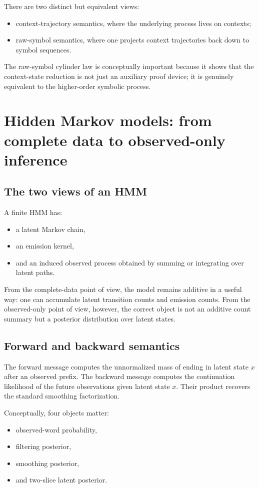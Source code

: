 \documentclass[11pt]{article}
\begin{document}
There are two distinct but equivalent views:
\begin{itemize}
  \item context-trajectory semantics, where the underlying process lives on
        contexts;
  \item raw-symbol semantics, where one projects context trajectories back down
        to symbol sequences.
\end{itemize}

The raw-symbol cylinder law is conceptually important because it shows that the
context-state reduction is not just an auxiliary proof device; it is genuinely
equivalent to the higher-order symbolic process.

\section{Hidden Markov models: from complete data to observed-only inference}

\subsection{The two views of an HMM}

A finite HMM has:
\begin{itemize}
  \item a latent Markov chain,
  \item an emission kernel,
  \item and an induced observed process obtained by summing or integrating over
        latent paths.
\end{itemize}

From the complete-data point of view, the model remains additive in a useful
way: one can accumulate latent transition counts and emission counts.  From the
observed-only point of view, however, the correct object is not an additive
count summary but a posterior distribution over latent states.

\subsection{Forward and backward semantics}

The forward message computes the unnormalized mass of ending in latent state
$x$ after an observed prefix.  The backward message computes the continuation
likelihood of the future observations given latent state $x$.  Their product
recovers the standard smoothing factorization.

Conceptually, four objects matter:
\begin{itemize}
  \item observed-word probability,
  \item filtering posterior,
  \item smoothing posterior,
  \item and two-slice latent posterior.
\end{itemize}
\end{document}
